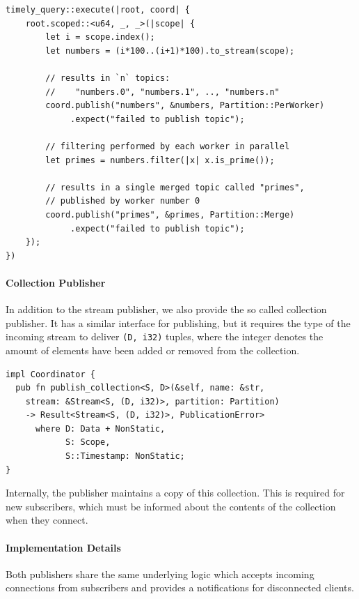 \begin{lstlisting}[caption={
Example use of publisher.
}]
timely_query::execute(|root, coord| {
    root.scoped::<u64, _, _>(|scope| {
        let i = scope.index();
        let numbers = (i*100..(i+1)*100).to_stream(scope);

        // results in `n` topics:
        //    "numbers.0", "numbers.1", .., "numbers.n"
        coord.publish("numbers", &numbers, Partition::PerWorker)
             .expect("failed to publish topic");

        // filtering performed by each worker in parallel
        let primes = numbers.filter(|x| x.is_prime());

        // results in a single merged topic called "primes",
        // published by worker number 0
        coord.publish("primes", &primes, Partition::Merge)
             .expect("failed to publish topic");
    });
})
\end{lstlisting}


\paragraph{Collection Publisher}

In addition to the stream publisher, we also provide the so called collection
publisher. It has a similar interface for publishing, but it requires the
type of the incoming stream to deliver \lstinline{(D, i32)} tuples, where
the integer denotes the amount of elements have been added or removed from
the collection.

\begin{lstlisting}[caption={[Collection publisher interface]
}]
impl Coordinator {
  pub fn publish_collection<S, D>(&self, name: &str,
    stream: &Stream<S, (D, i32)>, partition: Partition)
    -> Result<Stream<S, (D, i32)>, PublicationError>
      where D: Data + NonStatic, 
            S: Scope,
            S::Timestamp: NonStatic;
}
\end{lstlisting}

Internally, the publisher maintains a copy of this collection. This is required
for new subscribers, which must be informed about the contents of the collection
when they connect.

\paragraph{Implementation Details}

Both publishers share the same underlying logic which accepts incoming connections
from subscribers and provides a notifications for disconnected clients.

